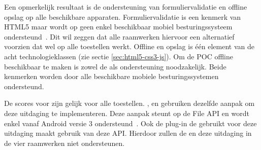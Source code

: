 Een opmerkelijk resultaat is de ondersteuning van formuliervalidatie en offline opslag op alle beschikbare apparaten.
Formuliervalidatie is een kenmerk van HTML5 maar wordt op geen enkel beschikbaar mobiel besturingssysteem ondersteund~\cite{Deveria2013}.
Dit wil zeggen dat alle raamwerken hiervoor een alternatief voorzien dat wel op alle toestellen werkt.
Offline en opslag is één element van de acht technologieklassen (zie sectie \ref{sec:html5-css3-js}).
Om de POC offline beschikbaar te maken is zowel de  als  ondersteuning noodzakelijk.
Beide kenmerken worden door alle beschikbare mobiele besturingssystemen ondersteund. %

De scores voor  zijn gelijk voor alle toestellen.
\kendo{}, \jqm{} en \lundo{} gebruiken dezelfde aanpak om deze uitdaging te implementeren.
Deze aanpak steunt op de File API en wordt enkel vanaf Android versie 3 ondersteund~\cite{Deveria2013a}.
Ook de plug-in de \st{} gebruikt voor deze uitdaging maakt gebruik van deze API.
Hierdoor zullen de \htc{} en \gtab{} deze uitdaging in de vier raamwerken niet ondersteunen.



